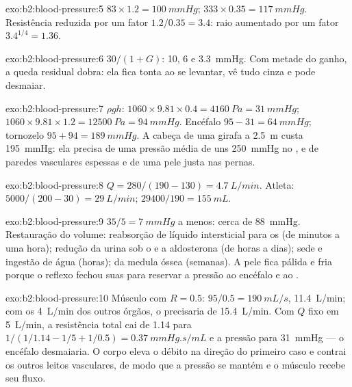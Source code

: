 \begin{solution}{exo:b2:blood-pressure:5}
$83\times 1.2 = \qty{100}{mmHg}$; $333\times 0.35 = \qty{117}{mmHg}$.
Resistência reduzida por um fator $1.2/0.35 = 3.4$: raio aumentado por
um fator $3.4^{1/4} =
1.36$.
\end{solution}

\begin{solution}{exo:b2:blood-pressure:6}
$30/(1 + G)$: 10, 6 e \qty{3.3}{mmHg}. Com metade do ganho, a queda
residual dobra: ela fica tonta ao se levantar, vê tudo cinza e pode
desmaiar.
\end{solution}

\begin{solution}{exo:b2:blood-pressure:7}
$\rho g h$: $1060\times 9.81\times 0.4 = \qty{4160}{Pa} =
\qty{31}{mmHg}$; $1060\times 9.81\times 1.2 = \qty{12500}{Pa} =
\qty{94}{mmHg}$. Encéfalo $95 - 31 = \qty{64}{mmHg}$; tornozelo
$95 + 94 =
\qty{189}{mmHg}$. A cabeça de uma girafa a \qty{2.5}{m} custa
\qty{195}{mmHg}: ela precisa de uma pressão média de uns
\qty{250}{mmHg} no , e de paredes vasculares espessas e de uma
pele justa nas pernas.
\end{solution}

\begin{solution}{exo:b2:blood-pressure:8}
$Q = 280/(190 - 130) = \qty{4.7}{L/min}$. Atleta: $5000/(200 - 30) =
\qty{29}{L/min}$;  $\num{29400}/190 = \qty{155}{mL}$.
\end{solution}

\begin{solution}{exo:b2:blood-pressure:9}
$35/5 = \qty{7}{mmHg}$ a menos: cerca de \qty{88}{mmHg}. Restauração do
volume: reabsorção de líquido intersticial para os  (de
minutos a uma hora); redução da urina sob o  e a
aldosterona (de horas a dias); sede e ingestão de água (horas); 
da medula óssea (semanas). A pele fica pálida e fria porque o reflexo
fechou suas  para reservar a pressão ao encéfalo e ao
.
\end{solution}

\begin{solution}{exo:b2:blood-pressure:10}
Músculo com $R = 0.5$: $95/0.5 = \qty{190}{mL/s}$, \qty{11.4}{L/min};
com os \qty{4}{L/min} dos outros órgãos, o  precisaria de
\qty{15.4}{L/min}. Com $Q$ fixo em \qty{5}{L/min}, a resistência total
cai de 1.14 para $1/(1/1.14 - 1/5 + 1/0.5) =
\qty{0.37}{mmHg.s/mL}$ e a pressão para \qty{31}{mmHg} --- o encéfalo
desmaiaria. O corpo eleva o débito na direção do primeiro caso e
contrai os outros leitos vasculares, de modo que a pressão se mantém e
o músculo recebe seu fluxo.
\end{solution}

